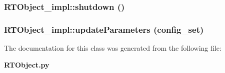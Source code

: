 \subsubsection{\setlength{\rightskip}{0pt plus 5cm}RTObject\_\-impl::shutdown ()}\label{classRTObject__impl_RTObject__impla68}


\subsubsection{\setlength{\rightskip}{0pt plus 5cm}RTObject\_\-impl::update\-Parameters (config\_\-set)}\label{classRTObject__impl_RTObject__impla61}




The documentation for this class was generated from the following file:\begin{CompactItemize}
\item 
{\bf RTObject.py}\end{CompactItemize}
